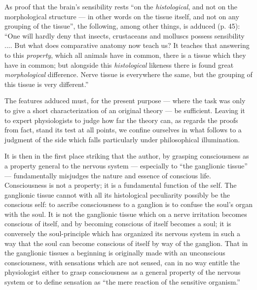 \documentclass[12pt,a4paper]{book}
\begin{document}
As proof that the brain's sensibility rests ``on the \emph{histological}, and not on
the morphological structure --- in other words on the tissue itself, and not on any
grouping of the tissue'', the following, among other things, is adduced (p. 45):
``One will hardly deny that insects, crustaceans and molluscs possess sensibility
.... But what does comparative anatomy now teach us? It teaches that answering to
this \emph{property}, which all animals have in common, there is a tissue which they
have in common; but alongside this \emph{histological} likeness there is found great
\emph{morphological} difference. Nerve tissue is everywhere the same, but the
grouping of this tissue is very different.''

The features adduced must, for the present purpose --- where the task was only to
give a short characterization of an original theory --- be sufficient. Leaving it to
expert physiologists to judge how far the theory can, as regards the proofs from
fact, stand its test at all points, we confine ourselves in what follows to a
judgment of the side which falls particularly under philosophical illumination.

It is then in the first place striking that the author, by grasping consciousness as
a property general to the nervous system --- especially to ``the ganglionic tissue''
--- fundamentally misjudges the nature and essence of conscious life. Consciousness
is not a property; it is a fundamental function of the self. The
ganglionic tissue cannot with all its histological peculiarity possibly be the
conscious self: to ascribe consciousness to a ganglion is to confuse the soul's
organ with the soul. It is not the ganglionic tissue which on a nerve irritation
becomes conscious of itself, and by becoming conscious of itself becomes a soul; it
is conversely the soul-principle which has organized its nervous system in such a way
that the soul can become conscious of itself by way of the ganglion. That in the
ganglionic tissues a beginning is originally made with an unconscious consciousness,
with sensations which are not sensed, can in no way entitle the physiologist either
to grasp consciousness as a general property of the nervous system or to define
sensation as ``the mere reaction of the sensitive organism.''
\end{document}
